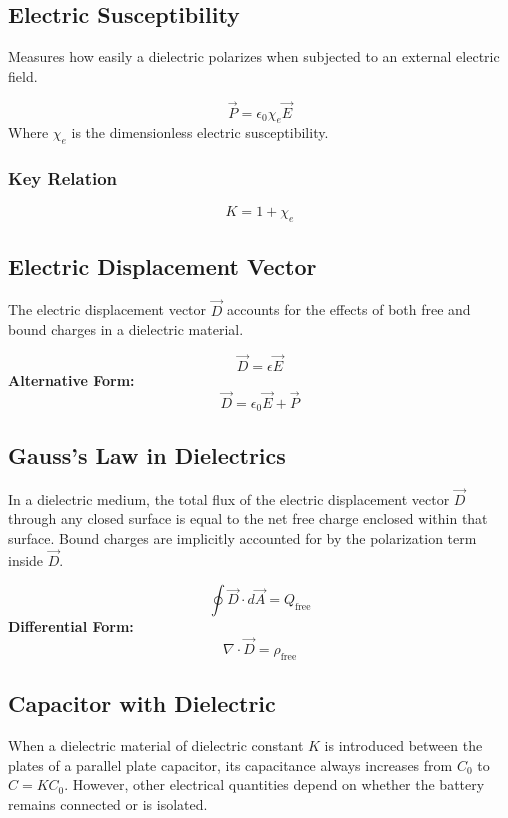 \documentclass[11pt,a4paper]{article}
\begin{document}
\subsection{Electric Susceptibility}
Measures how easily a dielectric polarizes when subjected to an external electric field.
\begin{formulabox}
    \[ \vec{P} = \epsilon_0 \chi_e \vec{E} \]
    Where $\chi_e$ is the dimensionless electric susceptibility.
\end{formulabox}

\subsubsection{Key Relation}
\begin{formulabox}
    \[ K = 1 + \chi_e \]
\end{formulabox}

\subsection{Electric Displacement Vector}
The electric displacement vector $\vec{D}$ accounts for the effects of both free and bound charges in a dielectric material.
\begin{formulabox}
    \[ \vec{D} = \epsilon \vec{E} \]
    \textbf{Alternative Form:}
    \[ \vec{D} = \epsilon_0 \vec{E} + \vec{P} \]
\end{formulabox}

\subsection{Gauss's Law in Dielectrics}
In a dielectric medium, the total flux of the electric displacement vector $\vec{D}$ through any closed surface is equal to the net free charge enclosed within that surface. Bound charges are implicitly accounted for by the polarization term inside $\vec{D}$.
\begin{formulabox}
    \[ \oint \vec{D} \cdot d\vec{A} = Q_{\text{free}} \]
    \textbf{Differential Form:}
    \[ \nabla \cdot \vec{D} = \rho_{\text{free}} \]
\end{formulabox}

\subsection{Capacitor with Dielectric}
When a dielectric material of dielectric constant $K$ is introduced between the plates of a parallel plate capacitor, its capacitance always increases from $C_0$ to $C = K C_0$. However, other electrical quantities depend on whether the battery remains connected or is isolated.
\end{document}
